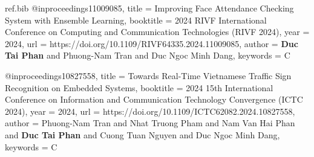 \begin{filecontents*}{ref.bib}
@inproceedings{11009085,
  title = {Improving Face Attendance Checking System with Ensemble Learning},
  booktitle = {2024 RIVF International Conference on Computing and Communication Technologies (RIVF 2024)},
  year = {2024},
  url = {https://doi.org/10.1109/RIVF64335.2024.11009085},
  author = {\textbf{Duc Tai Phan} and Phuong-Nam Tran and Duc Ngoc Minh Dang},
  keywords = {C}
}

@inproceedings{10827558,
  title = {Towards Real-Time Vietnamese Traffic Sign Recognition on Embedded Systems},
  booktitle = {2024 15th International Conference on Information and Communication Technology Convergence (ICTC 2024)},
  year = {2024},
  url = {https://doi.org/10.1109/ICTC62082.2024.10827558},
  author = {Phuong-Nam Tran and Nhat Truong Pham and Nam Van Hai Phan and \textbf{Duc Tai Phan} and Cuong Tuan Nguyen and Duc Ngoc Minh Dang},
  keywords = {C}
}
\end{filecontents*}

%
%
%
%
%
%

\documentclass[11pt]{article} %
\usepackage[margin=1in]{geometry} %

